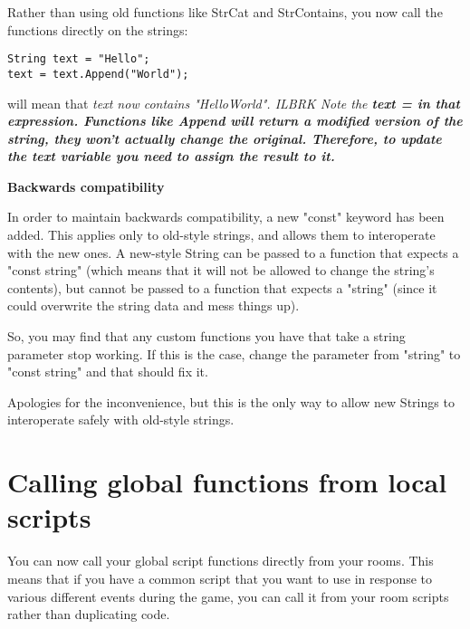 Rather than using old functions like StrCat and StrContains, you now call the functions
directly on the strings:
\begin{verbatim}
String text = "Hello";
text = text.Append("World");
\end{verbatim}
will mean that \it{text} now contains "HelloWorld". ILBRK
Note the \bf{text =} in that expression. Functions like Append will return a modified version
of the string, they won't actually change the original. Therefore, to update the \it{text}
variable you need to assign the result to it.

\bf{Backwards compatibility}

In order to maintain backwards compatibility, a new "const" keyword has been added. This
applies only to old-style strings, and allows them to interoperate with the new ones. A
new-style String can be passed to a function that expects a "const string" (which means
that it will not be allowed to change the string's contents), but cannot be passed to a
function that expects a "string" (since it could overwrite the string data and mess things up).

So, you may find that any custom functions you have that take a string parameter stop
working. If this is the case, change the parameter from "string" to "const string" and
that should fix it.

Apologies for the inconvenience, but this is the only way to allow new Strings to
interoperate safely with old-style strings.



\section{Calling global functions from local scripts}%

You can now call your global script functions directly from your rooms. This
means that if you have a common script that you want to use in response to
various different events during the game, you can call it from your room
scripts rather than duplicating code.

